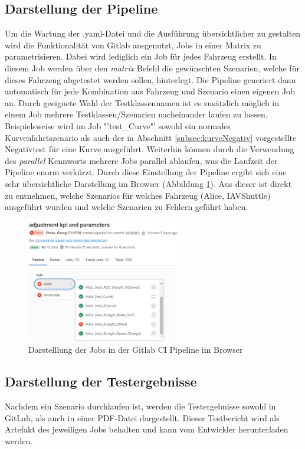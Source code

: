 \subsection{Darstellung der Pipeline}
Um die Wartung der .yaml-Datei und die Ausführung übersichtlicher zu gestalten wird die Funktionalität von Gitlab ausgenutzt, Jobs in einer Matrix zu parametrisieren. Dabei wird lediglich ein Job für jedes Fahrzeug erstellt. In diesem Job werden über den \textit{matrix} Befehl die gewünschten Szenarien, welche für dieses Fahrzeug abgetestet werden sollen, hinterlegt. Die Pipeline generiert dann automatisch für jede Kombination aus Fahrzeug und Szenario einen eigenen Job an. Durch geeignete Wahl der Testklassennamen ist es zusätzlich möglich in einem Job mehrere Testklassen/Szenarien nacheinander laufen zu lassen. Beispielsweise wird im Job "'test\_Curve"' sowohl ein normales Kurvenfahrtszenario als auch der in Abschnitt \ref{subsec:kurveNegativ} vorgestellte Negativtest für eine Kurve ausgeführt. Weiterhin können durch die Verwendung des \textit{parallel} Kennworts mehrere Jobs parallel ablaufen, was die Laufzeit der Pipeline enorm verkürzt. Durch diese Einstellung der Pipeline ergibt sich eine sehr übersichtliche Darstellung im Browser (Abbildung \ref{fig:uebersicht_pipeline}). Aus dieser ist direkt zu entnehmen, welche Szenarios für welches Fahrzeug (Alice, IAVShuttle) ausgeführt wurden und welche Szenarien zu Fehlern geführt haben.
\begin{figure}[ht]
    \centering
    \includegraphics[width=0.6\textwidth]{figures/3_Implementierung/uebersicht_pipeline.png}
    \caption{Darstelllung der Jobs in der Gitlab CI Pipeline im Browser}
    \label{fig:uebersicht_pipeline}
\end{figure}

\subsection{Darstellung der Testergebnisse}
Nachdem ein Szenario durchlaufen ist, werden die Testergebnisse sowohl in GitLab, als auch in einer PDF-Datei dargestellt. Dieser Testbericht wird als Artefakt des jeweiligen Jobs behalten und kann vom Entwickler herunterladen werden.

